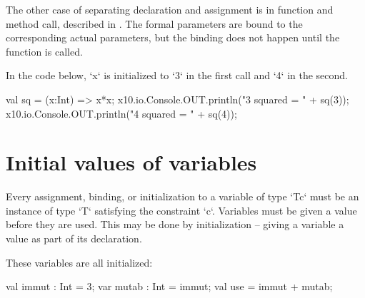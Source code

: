 The other case of separating declaration and assignment is in function
and method call, described in .  The formal
parameters are bound to the corresponding actual 
parameters, but the binding does not happen until the function is called.  

\begin{ex}
In
the code below, \xcd`x` is initialized to \xcd`3` in the first call and
\xcd`4` in the second.
\begin{xten}
val sq = (x:Int) => x*x;
x10.io.Console.OUT.println("3 squared = " + sq(3));
x10.io.Console.OUT.println("4 squared = " + sq(4));
\end{xten}
\end{ex}





\section{Initial values of variables}
\label{NullaryConstructor}


Every assignment, binding, or initialization to a variable of type \xcd`T{c}`
must be an instance of type \xcd`T` satisfying the constraint \xcd`{c}`.
Variables must be given a value before they are used. This may be done by
initialization -- giving a variable a value as part
of its declaration. 

\begin{ex}
These variables are all initialized: 
\begin{xten}
  val immut : Int = 3;
  var mutab : Int = immut;
  val use = immut + mutab;
\end{xten}
\end{ex}

